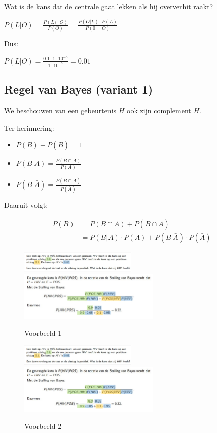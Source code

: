 \documentclass{article}
\begin{document}
Wat is de kans dat de centrale gaat lekken als hij oververhit raakt?

$P(L|O) = \frac{P(L\cap O)}{P(O)} = \frac{P(O|L)\cdot P(L)}{P(0=O)}$

Dus:

$P(L|O) = \frac{0.1 \cdot 1 \cdot 10^{-8}}{1\cdot 10^{-7}} = 0.01$


\subsection{Regel van Bayes (variant 1)}

We beschouwen van een gebeurtenis $H$ ook zijn complement $\bar{H}$.

Ter herinnering:

\begin{itemize}
    \item $P(B) + P(\bar{B}) = 1$
    \item $P(B|A) = \frac{P(B \cap A)}{P(A)}$
    \item $P(B|\bar{A}) = \frac{P(B \cap \bar{A})}{P(\bar{A})}$
\end{itemize}

Daaruit volgt:

\begin{center}
    \begin{align}
        P(B) & = P(B \cap A) + P(B \cap \bar{A})\\
        & = P(B | A) \cdot P(A) + P(B | \bar{A}) \cdot P(\bar{A})
    \end{align}
\end{center}

\begin{figure}[H]
    \centering
    \includegraphics[width=0.5\textwidth]{bayes-variant-voorbeeld1.png}
    \includegraphics[width=0.6\textwidth]{bayes-variant-voorbeeld1-opl.png}
    \caption{Voorbeeld 1}
\end{figure}

\begin{figure}[H]
    \centering
    \includegraphics[width=0.5\textwidth]{bayes-variant-voorbeeld1.png}
    \includegraphics[width=0.6\textwidth]{bayes-variant-voorbeeld1-opl.png}
    \caption{Voorbeeld 2}
\end{figure}
\end{document}

